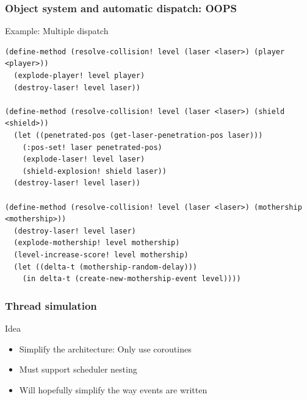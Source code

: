 \documentclass{beamer}
\newcommand{\<}[1]{\`#1}
\begin{document}
\begin{frame}[fragile]
  \frametitle{Object system and automatic dispatch: OOPS}

  \begin{block}{Example: Multiple dispatch}
    \begin{lstlisting}[basicstyle=\scriptsize]
(define-method (resolve-collision! level (laser <laser>) (player <player>))
  (explode-player! level player)
  (destroy-laser! level laser))

(define-method (resolve-collision! level (laser <laser>) (shield <shield>))
  (let ((penetrated-pos (get-laser-penetration-pos laser)))
    (:pos-set! laser penetrated-pos)
    (explode-laser! level laser)
    (shield-explosion! shield laser))
  (destroy-laser! level laser))

(define-method (resolve-collision! level (laser <laser>) (mothership <mothership>))
  (destroy-laser! level laser)
  (explode-mothership! level mothership)
  (level-increase-score! level mothership)
  (let ((delta-t (mothership-random-delay)))
    (in delta-t (create-new-mothership-event level))))
    \end{lstlisting}
  \end{block}
\end{frame}

\begin{frame}
  \frametitle{Thread simulation}

  \begin{block}{Idea}
    \begin{itemize}
    \item Simplify the architecture: Only use coroutines
    \item Must support scheduler \alert{nesting}
    \item Will hopefully simplify the way events are written
    \end{itemize}
  \end{block}
\end{frame}
\end{document}
